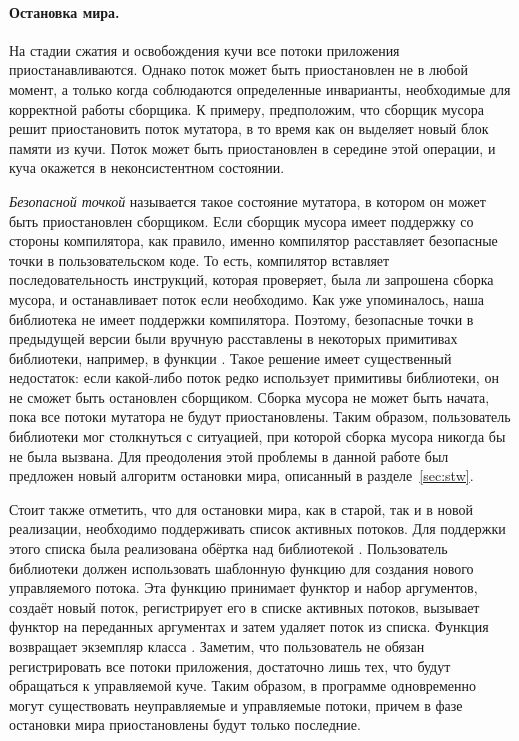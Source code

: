 \paragraph{Остановка мира.}
На стадии сжатия и освобождения кучи все потоки приложения приостанавливаются. 
Однако поток может быть приостановлен не в любой момент, а только когда соблюдаются 
определенные инварианты, необходимые для корректной работы сборщика. 
К примеру, предположим, что сборщик мусора решит приостановить поток мутатора, в то время 
как он выделяет новый блок памяти из кучи. 
Поток может быть приостановлен в середине этой операции, и куча окажется в неконсистентном 
состоянии.
    
\emph{Безопасной точкой} называется такое состояние мутатора, в котором он может быть 
приостановлен сборщиком. 
Если сборщик мусора имеет поддержку со стороны компилятора, как правило, именно компилятор 
расставляет безопасные точки в пользовательском коде. 
То есть, компилятор вставляет последовательность инструкций, которая проверяет, была ли 
запрошена сборка мусора, и останавливает поток если необходимо. 
Как уже упоминалось, наша библиотека не имеет поддержки компилятора. 
Поэтому, безопасные точки в предыдущей версии были вручную расставлены в некоторых 
примитивах библиотеки, например, в функции . 
Такое решение имеет существенный недостаток: если какой-либо поток редко использует 
примитивы библиотеки, он не сможет быть остановлен сборщиком. 
Сборка мусора не может быть начата, пока все потоки мутатора не будут приостановлены. 
Таким образом, пользователь библиотеки мог столкнуться с ситуацией, при которой сборка 
мусора никогда бы не была вызвана. 
Для преодоления этой проблемы в данной работе был предложен новый алгоритм остановки мира, 
описанный в разделе~\ref{sec:stw}.

Стоит также отметить, что для остановки мира, как в старой, так и в новой реализации, 
необходимо поддерживать список активных потоков. 
Для поддержки этого списка была реализована обёртка над библиотекой . 
Пользователь библиотеки должен использовать шаблонную функцию  
для создания нового управляемого потока. 
Эта функцию принимает функтор и набор аргументов, создаёт новый поток, регистрирует его в 
списке активных потоков, вызывает функтор на переданных аргументах и затем удаляет поток из 
списка. 
Функция  возвращает экземпляр класса . 
Заметим, что пользователь не обязан регистрировать все потоки приложения, достаточно лишь тех, 
что будут обращаться к управляемой куче. 
Таким образом, в программе одновременно могут существовать неуправляемые и управляемые потоки, 
причем в фазе остановки мира приостановлены будут только последние. 

